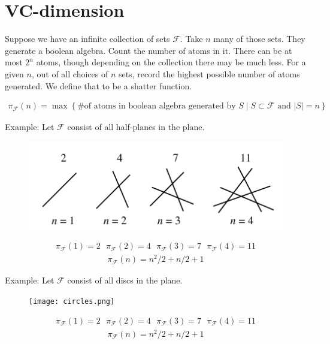 \documentclass{amsart}
\newcommand{\F}{\mathcal F}
\newcommand{\curly}[1]{\left\{ #1 \right\}}
\begin{document}
\section{VC-dimension}

Suppose we have an infinite collection of sets $\F$.
Take $n$ many of those sets.
They generate a boolean algebra.
Count the number of atoms in it.
There can be at most $2^n$ atoms, though depending on the collection there may be much less.
For a given $n$, out of all choices of $n$ sets, record the highest possible number of atoms generated.
We define that to be a shatter function.

\begin{Definition}
	\begin{align*}
		\pi_\F(n) = \max \curly{ \text {\# of atoms in boolean algebra generated by $S$} \mid S \subset \F \text{ and } |S| = n}
	\end{align*}
\end{Definition}

Example: Let $\F$ consist of all half-planes in the plane.
\begin{figure}[p]
	\centering
	\includegraphics[scale=0.75]{lines.png}
\end{figure}
\begin{align*}
	\pi_\F(1) = 2 \ \ \  \pi_\F(2) = 4 \ \ \  \pi_\F(3) = 7  \ \ \ \pi_\F(4) = 11
\end{align*}
\begin{align*}
	\pi_\F(n) = n^2/2 + n/2 + 1
\end{align*}

Example: Let $\F$ consist of all discs in the plane.
\begin{figure}[p]
	\centering
	\texttt{[image: circles.png]}
\end{figure}
\begin{align*}
	\pi_\F(1) = 2 \ \ \  \pi_\F(2) = 4 \ \ \  \pi_\F(3) = 7  \ \ \ \pi_\F(4) = 11
\end{align*}
\begin{align*}
	\pi_\F(n) = n^2/2 + n/2 + 1
\end{align*}
\end{document}
